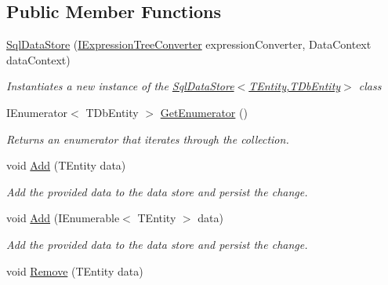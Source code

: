 \subsection*{Public Member Functions}
\begin{DoxyCompactItemize}
\item 
\hyperlink{classCqrs_1_1Sql_1_1DataStores_1_1SqlDataStore_a3ddc911126acbde0353e7773ddfa8acc_a3ddc911126acbde0353e7773ddfa8acc}{Sql\+Data\+Store} (\hyperlink{interfaceCqrs_1_1Sql_1_1DataStores_1_1IExpressionTreeConverter}{I\+Expression\+Tree\+Converter} expression\+Converter, Data\+Context data\+Context)
\begin{DoxyCompactList}\small\item\em Instantiates a new instance of the \hyperlink{classCqrs_1_1Sql_1_1DataStores_1_1SqlDataStore_a3ddc911126acbde0353e7773ddfa8acc_a3ddc911126acbde0353e7773ddfa8acc}{Sql\+Data\+Store$<$\+T\+Entity,\+T\+Db\+Entity$>$} class \end{DoxyCompactList}\item 
I\+Enumerator$<$ T\+Db\+Entity $>$ \hyperlink{classCqrs_1_1Sql_1_1DataStores_1_1SqlDataStore_a2114238ed13dfe1beaf1b096d3e36c6a_a2114238ed13dfe1beaf1b096d3e36c6a}{Get\+Enumerator} ()
\begin{DoxyCompactList}\small\item\em Returns an enumerator that iterates through the collection. \end{DoxyCompactList}\item 
void \hyperlink{classCqrs_1_1Sql_1_1DataStores_1_1SqlDataStore_a715ab041546e864cb9551d165c240f33_a715ab041546e864cb9551d165c240f33}{Add} (T\+Entity data)
\begin{DoxyCompactList}\small\item\em Add the provided {\itshape data}  to the data store and persist the change. \end{DoxyCompactList}\item 
void \hyperlink{classCqrs_1_1Sql_1_1DataStores_1_1SqlDataStore_a510fc3eafe64f999b99290cd8924a00e_a510fc3eafe64f999b99290cd8924a00e}{Add} (I\+Enumerable$<$ T\+Entity $>$ data)
\begin{DoxyCompactList}\small\item\em Add the provided {\itshape data}  to the data store and persist the change. \end{DoxyCompactList}\item 
void \hyperlink{classCqrs_1_1Sql_1_1DataStores_1_1SqlDataStore_ada15bdc873b3e4be8ff9a734d84562fb_ada15bdc873b3e4be8ff9a734d84562fb}{Remove} (T\+Entity data)

\end{DoxyCompactItemize}

